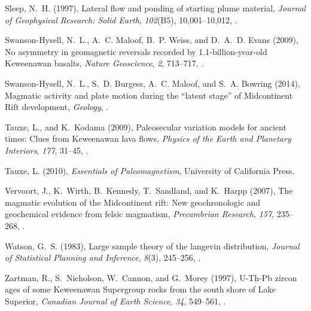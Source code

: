 \documentclass[draft,gc]{AGUTeX}
\begin{document}
\begin{article}
\begin{thebibliography}{24}
Sleep, N.~H. (1997), Lateral flow and ponding of starting plume material,
  \textit{Journal of Geophysical Research: Solid Earth}, \textit{102}(B5),
  10,001--10,012, .

Swanson-Hysell, N.~L., A.~C. Maloof, B.~P. Weiss, and D.~A.~D. Evans (2009), No
  asymmetry in geomagnetic reversals recorded by 1.1-billion-year-old
  {K}eweenawan basalts, \textit{Nature Geoscience}, \textit{2}, 713--717,
  .
  
Swanson-Hysell, N.~L., S.~D. Burgess, A.~C. Maloof, and S.~A. Bowring (2014),
  Magmatic activity and plate motion during the ``latent stage'' of
  {M}idcontinent {R}ift development, \textit{Geology}, .
  
Tauxe, L., and K.~Kodama (2009), Paleosecular variation models for ancient
  times: Clues from {K}eweenawan lava flows, \textit{Physics of the Earth and
  Planetary Interiors}, \textit{177}, 31--45, .

{Tauxe}, L. (2010), \textit{Essentials of Paleomagnetism}, University of
  California Press.

Vervoort, J., K.~Wirth, B.~Kennedy, T.~Sandland, and K.~Harpp (2007), The
  magmatic evolution of the {M}idcontinent rift: New geochronologic and
  geochemical evidence from felsic magmatism, \textit{Precambrian Research},
  \textit{157}, 235--268, .

Watson, G.~S. (1983), Large sample theory of the langevin distribution,
  \textit{Journal of Statistical Planning and Inference}, \textit{8}(3),
  245--256, .

Zartman, R., S.~Nicholson, W.~Cannon, and G.~Morey (1997), {U-Th-Pb} zircon
  ages of some {K}eweenawan {S}upergroup rocks from the south shore of {L}ake
  {S}uperior, \textit{Canadian Journal of Earth Science}, \textit{34},
  549--561, .


\end{thebibliography}
\end{article}
\end{document}
